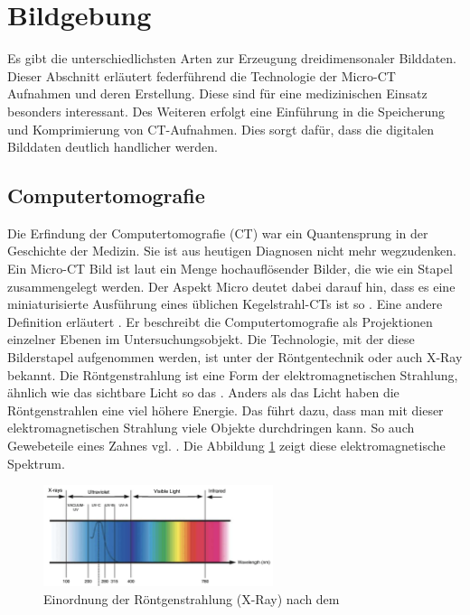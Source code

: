 \section{Bildgebung}
\label{sec:technologisch} Es gibt die unterschiedlichsten Arten zur Erzeugung dreidimensonaler
Bilddaten. Dieser Abschnitt erläutert federführend die Technologie der Micro-CT
Aufnahmen und deren Erstellung. Diese sind für eine medizinischen Einsatz besonders
interessant. Des Weiteren erfolgt eine Einführung in die Speicherung und
Komprimierung von CT-Aufnahmen. Dies sorgt dafür, dass die digitalen Bilddaten
deutlich handlicher werden.

\subsection{Computertomografie}
\label{subsec:computertomografie} Die Erfindung der Computertomografie (CT) war
ein Quantensprung in der Geschichte der Medizin. Sie ist aus heutigen Diagnosen nicht
mehr wegzudenken. Ein Micro-CT Bild ist laut \citet[Abstract]{baird2017} ein
Menge hochauflösender Bilder, die wie ein Stapel zusammengelegt werden. Der
Aspekt Micro deutet dabei darauf hin, dass es eine miniaturisierte Ausführung eines
üblichen Kegelstrahl-CTs ist so \citet[Seite 340]{buzug2011}. Eine andere
Definition erläutert \citet{lehmann2013bildverarbeitung}. Er beschreibt die
Computertomografie als Projektionen einzelner Ebenen im Untersuchungsobjekt. Die
Technologie, mit der diese Bilderstapel aufgenommen werden, ist unter der Röntgentechnik
oder auch X-Ray bekannt. Die Röntgenstrahlung ist eine Form der
elektromagnetischen Strahlung, ähnlich wie das sichtbare Licht so das \citet{nib2024}.
Anders als das Licht haben die Röntgenstrahlen eine viel höhere Energie. Das
führt dazu, dass man mit dieser elektromagnetischen Strahlung viele Objekte durchdringen
kann. So auch Gewebeteile eines Zahnes vgl. \citep{nib2024}. Die Abbildung \ref{fig:spectrum}
zeigt diese elektromagnetische Spektrum.

\begin{figure}[h]
	\centering
	\includegraphics[width=0.6\textwidth]{img/x_ray.jpg}
	\caption{Einordnung der Röntgenstrahlung (X-Ray) nach dem \citet{zwinkels2015}}
	\label{fig:spectrum}
\end{figure}

